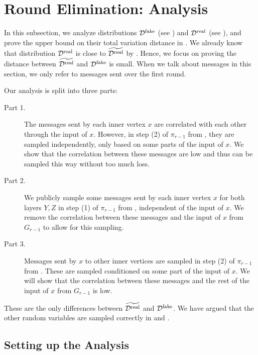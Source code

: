 \documentclass[11pt]{article}
\theoremstyle{definition}
\newcommand{\prot}{\ensuremath{\pi}}
\newcommand{\cD}{\ensuremath{\mathcal{D}}}
\newcommand{\cDreal}{\ensuremath{\cD^{\textnormal{real}}}}
\newcommand{\cDrealtil}{\ensuremath{\widetilde{\cDreal}}}
\newcommand{\cDfake}{\ensuremath{\cD^{\textnormal{fake}}}}
\begin{document}
\section{Round Elimination: Analysis}\label{sec:round-elim-analysis}
In this subsection, we analyze distributions $\cDfake$ (see ) and $\cDreal$ (see ), and prove the upper bound on their total variation distance in . 
We already know that distribution $\cDreal$ is close to $\cDrealtil$ by . Hence, we focus on proving the distance between $\cDrealtil$ and $\cDfake$ is small.
When we talk about messages in this section, we only refer to messages sent over the first round. 

 Our analysis is split into three parts:

\begin{description}
	\item[Part 1.] The messages sent by each inner vertex $x$ are correlated with each other through the input of $x$. However, in step (2) of $\prot_{r-1}$ from , they are sampled independently, only based on some parts of the input of $x$. We show that the correlation between these messages are low and thus can be sampled this way without too much loss.
	
	\item[Part 2.] We publicly sample some messages sent by each inner vertex $x$ for both layers $Y, Z$ in step (1) of $\prot_{r-1}$ from , independent of the input of $x$. We remove the correlation between these messages and the input of $x$ from $G_{r-1}$ to allow for this sampling. 
	
	\item[Part 3.] Messages sent by $x$ to other inner vertices are sampled in step (2) of $\prot_{r-1}$ from . These are sampled conditioned on some part of the input of $x$. We will show that the correlation between these messages and the rest of the input of $x$ from $G_{r-1}$ is low.
\end{description}


These are the only differences between $\cDrealtil$ and $\cDfake$. We have argued that the other random variables are sampled correctly in  and .

\subsection{Setting up the Analysis}\label{subsec:setup-analysis}
\end{document}
